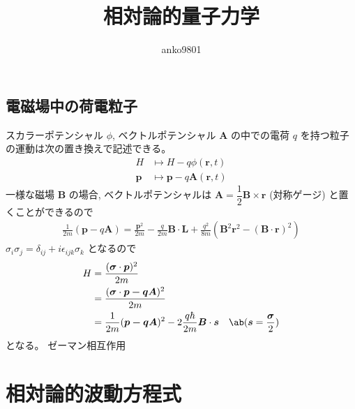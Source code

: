 \documentclass[uplatex,dvipdfmx,a4paper,11pt]{jlreq}
\title{相対論的量子力学}
\author{anko9801}
\newcommand{\rr}{\bm{r}}
\numberwithin{equation}{section}
\theoremstyle{definition}
\begin{document}
\maketitle
\tableofcontents
\clearpage

\subsection{電磁場中の荷電粒子}
スカラーポテンシャル $\phi$, ベクトルポテンシャル $\bm{A}$ の中での電荷 $q$ を持つ粒子の運動は次の置き換えで記述できる。
\begin{align}
  H      & \mapsto H - q\phi(\rr, t)        \\
  \bm{p} & \mapsto \bm{p} - q\bm{A}(\rr, t)
\end{align}
一様な磁場 $\bm{B}$ の場合, ベクトルポテンシャルは $\bm{A} = \dfrac{1}{2}\bm{B}\times\rr$ (対称ゲージ) と置くことができるので
\begin{align}
  \frac{1}{2m}(\bm{p} - q\bm{A}) = \frac{\bm{p}^2}{2m} - \frac{q}{2m}\bm{B}\cdot\bm{L} + \frac{q^2}{8m}(\bm{B}^2\rr^2 - (\bm{B}\cdot\rr)^2)
\end{align}
$\sigma_i\sigma_j = \delta_{ij} + i\epsilon_{ijk}\sigma_k$ となるので
\begin{align}
  H & = \frac{(\bm{\sigma}\cdot\bm{p})^2}{2m}                                                                        \\
    & = \frac{(\bm{\sigma}\cdot\bm{p - q\bm{A}})^2}{2m}                                                              \\
    & = \frac{1}{2m}(\bm{p - q\bm{A}})^2 - 2\frac{q\hbar}{2m}\bm{B}\cdot\bm{s} & \ab(\bm{s} = \frac{\bm{\sigma}}{2})
\end{align}
となる。
ゼーマン相互作用

\section{相対論的波動方程式}
\end{document}
